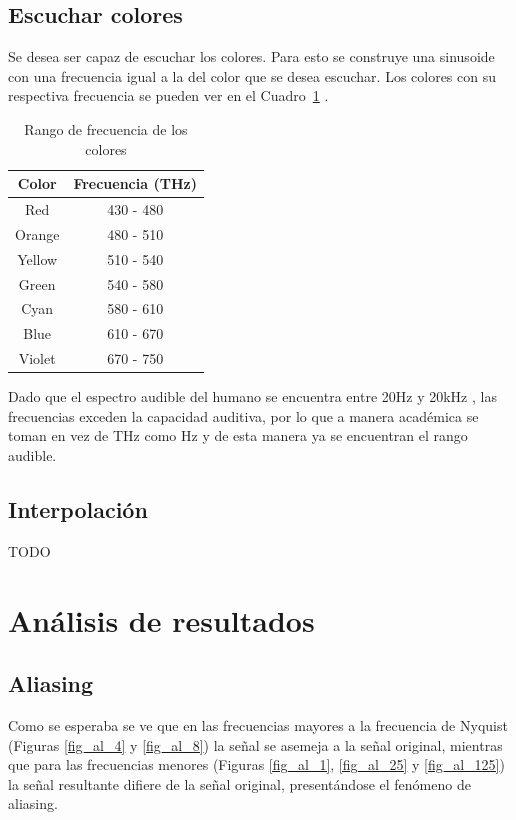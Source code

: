 \documentclass[comsoc, journal]{IEEEtran}
\begin{document}
\subsection{Escuchar colores}
Se desea ser capaz de escuchar los colores. Para esto se construye una sinusoide con una frecuencia igual a la del color que se desea escuchar. Los colores con su respectiva frecuencia se pueden ver en el Cuadro~\ref{table_color} \cite{bohren}.

\begin{table}[!t]
    \renewcommand{\arraystretch}{1.3}
    \caption{Rango de frecuencia de los colores}
    \label{table_color}
    \centering
    \begin{tabular}{|c|c|}
        \hline
        Color & Frecuencia (THz)\\
        \hline
        Red	    & 430 - 480\\
        \hline
        Orange	& 480 - 510\\
        \hline
        Yellow	& 510 - 540\\
        \hline
        Green	& 540 - 580\\
        \hline
        Cyan	& 580 - 610\\
        \hline
        Blue	& 610 - 670\\
        \hline
        Violet	& 670 - 750\\
        \hline
    \end{tabular}
\end{table}

Dado que el espectro audible del humano se encuentra entre 20Hz y 20kHz \cite{rosen}, las frecuencias exceden la capacidad auditiva, por lo que a manera académica se toman en vez de THz como Hz y de esta manera ya se encuentran el rango audible.

\subsection{Interpolación}
TODO

\section{Análisis de resultados}
\subsection{Aliasing}
Como se esperaba se ve que en las frecuencias mayores a la frecuencia de Nyquist (Figuras \ref{fig_al_4} y \ref{fig_al_8}) la señal se asemeja a la señal original, mientras que para las frecuencias menores (Figuras \ref{fig_al_1}, \ref{fig_al_25} y \ref{fig_al_125}) la señal resultante difiere de la señal original, presentándose el fenómeno de aliasing.
\end{document}
